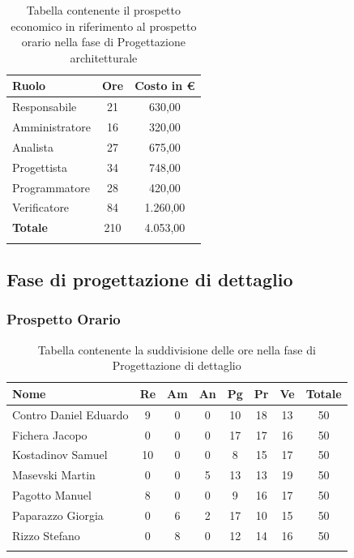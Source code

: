 \documentclass[../piano_di_progetto.tex]{subfiles}
\begin{document}
\begin{center}
	\begin{longtable}{|l|c|c|}
		\hline
		\rowcolor{lightgray}
		\textbf{Ruolo} & \textbf{Ore} & \textbf{Costo in €}\\

		\hline
		Responsabile & 21 & 630,00\\
		Amministratore & 16 & 320,00\\
		Analista & 27 & 675,00\\
		Progettista & 34 & 748,00\\
		Programmatore & 28 & 420,00\\
		Verificatore & 84 & 1.260,00\\
		\hline
		\textbf{Totale} & 210 & 4.053,00\\
		\hline
		\rowcolor{white}
		\caption{Tabella contenente il prospetto economico in riferimento al prospetto orario nella fase di Progettazione architetturale}
	\end{longtable}
\end{center}

\subsection{ Fase di progettazione di dettaglio}%
\label{sub:fase_prog_dett}
\subsubsection{Prospetto Orario}

\begin{center}
	\begin{longtable}{|l|c|c|c|c|c|c|c|}
		\hline
		\rowcolor{lightgray}
		\textbf{Nome} & \textbf{Re} & \textbf{Am} & \textbf{An} & \textbf{Pg}  & \textbf{Pr}   & \textbf{Ve} & \textbf{Totale} \\

		\hline
			Contro Daniel Eduardo & 9 & 0 & 0 & 10 & 18 & 13 & 50 \\
			Fichera Jacopo & 0 & 0 & 0 & 17 & 17 & 16 & 50 \\
			Kostadinov Samuel & 10 & 0 & 0 & 8 & 15 & 17 & 50 \\			
			Masevski Martin & 0 & 0 & 5 & 13 & 13 & 19 & 50 \\
			Pagotto Manuel & 8 & 0 & 0 & 9 & 16 & 17 & 50 \\		
			Paparazzo Giorgia & 0 & 6 & 2 & 17 & 10 & 15 & 50 \\
			Rizzo Stefano & 0 & 8 & 0 & 12 & 14 & 16 & 50 \\
		\hline	
		\rowcolor{white}
		\caption{Tabella contenente la suddivisione delle ore nella fase di Progettazione di dettaglio}
	\end{longtable}
\end{center}
\end{document}

